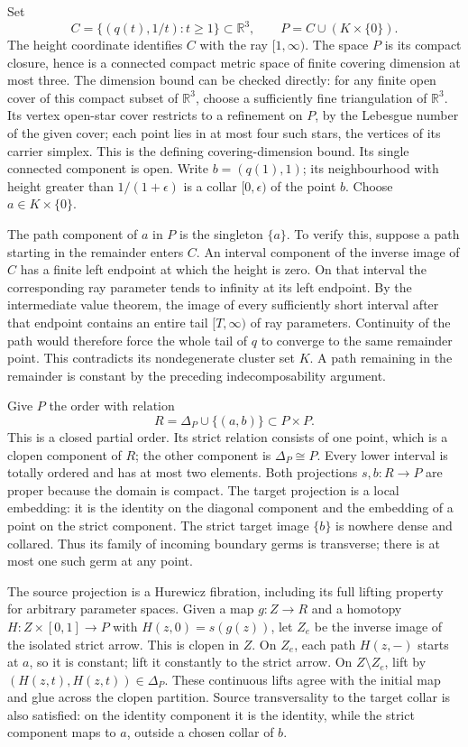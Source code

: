 Set \[
 C=\{(q(t),1/t):t\ge1\}\subset\mathbb R^3,
 \qquad P=C\cup(K\times\{0\}).
\] The height coordinate identifies \(C\) with the ray \([1,\infty)\). The space \(P\) is its compact closure, hence is a connected compact metric space of finite covering dimension at most three. The dimension bound can be checked directly: for any finite open cover of this compact subset of \(\mathbb R^3\), choose a sufficiently fine triangulation of \(\mathbb R^3\). Its vertex open-star cover restricts to a refinement on \(P\), by the Lebesgue number of the given cover; each point lies in at most four such stars, the vertices of its carrier simplex. This is the defining covering-dimension bound. Its single connected component is open. Write \(b=(q(1),1)\); its neighbourhood with height greater than \(1/(1+\epsilon)\) is a collar \([0,\epsilon)\) of the point \(b\). Choose \(a\in K\times\{0\}\).

The path component of \(a\) in \(P\) is the singleton \(\{a\}\). To verify this, suppose a path starting in the remainder enters \(C\). An interval component of the inverse image of \(C\) has a finite left endpoint at which the height is zero. On that interval the corresponding ray parameter tends to infinity at its left endpoint. By the intermediate value theorem, the image of every sufficiently short interval after that endpoint contains an entire tail \([T,\infty)\) of ray parameters. Continuity of the path would therefore force the whole tail of \(q\) to converge to the same remainder point. This contradicts its nondegenerate cluster set \(K\). A path remaining in the remainder is constant by the preceding indecomposability argument.

Give \(P\) the order with relation \[
 R=\Delta_P\cup\{(a,b)\}\subset P\times P.
\] This is a closed partial order. Its strict relation consists of one point, which is a clopen component of \(R\); the other component is \(\Delta_P\cong P\). Every lower interval is totally ordered and has at most two elements. Both projections \(s,b:R\to P\) are proper because the domain is compact. The target projection is a local embedding: it is the identity on the diagonal component and the embedding of a point on the strict component. The strict target image \(\{b\}\) is nowhere dense and collared. Thus its family of incoming boundary germs is transverse; there is at most one such germ at any point.

The source projection is a Hurewicz fibration, including its full lifting property for arbitrary parameter spaces. Given a map \(g:Z\to R\) and a homotopy \(H:Z\times[0,1]\to P\) with \(H(z,0)=s(g(z))\), let \(Z_e\) be the inverse image of the isolated strict arrow. This is clopen in \(Z\). On \(Z_e\), each path \(H(z,-)\) starts at \(a\), so it is constant; lift it constantly to the strict arrow. On \(Z\setminus Z_e\), lift by \((H(z,t),H(z,t))\in\Delta_P\). These continuous lifts agree with the initial map and glue across the clopen partition. Source transversality to the target collar is also satisfied: on the identity component it is the identity, while the strict component maps to \(a\), outside a chosen collar of \(b\).

